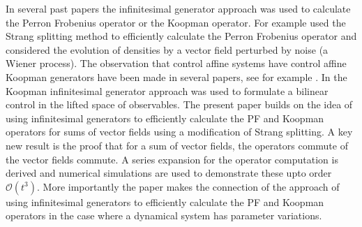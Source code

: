 \documentclass[pdflatex,sn-mathphys]{sn-jnl}%
\theoremstyle{thmstyleone}%
\theoremstyle{thmstyletwo}%
\theoremstyle{thmstylethree}%
\begin{document}
In several past papers the infinitesimal generator approach was used to calculate the Perron Frobenius operator or the Koopman operator. For example \cite{Froyland2024} used the Strang splitting method to efficiently calculate the Perron Frobenius operator and \cite{Froyland2020} considered the evolution of densities by a vector field perturbed by noise (a Wiener process). The observation that control affine systems have control affine Koopman generators have been made in several papers, see for example \cite{goswami_paley_2017, rowley_siam_2020, rowley_siam_2024}. In \cite{rowley_siam_2020, rowley_siam_2024} the Koopman infinitesimal generator approach was used to formulate a bilinear control in the lifted space of observables. The present paper builds on the idea of using infinitesimal generators to efficiently calculate the PF and Koopman operators for sums of vector fields using a modification of Strang splitting. A key new result is the proof that for a sum of vector fields, the operators commute of the vector fields commute. A series expansion for the operator computation is derived and numerical simulations are used to demonstrate these upto order $\mathcal{O}(t^3)$. More importantly the paper makes the connection of the approach of using infinitesimal generators to efficiently calculate the PF and Koopman operators in the case where a dynamical system has parameter variations.
\end{document}
